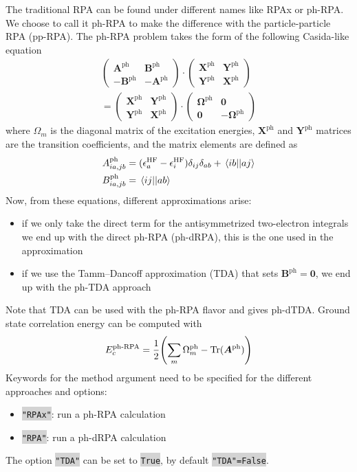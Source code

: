 \documentclass[aip,jcp,reprint,noshowkeys,superscriptaddress]{revtex4-1}
\newcommand{\GW}{\text{$GW$}}
\newcommand{\HF}{\text{HF}}
\newcommand{\ph}{\text{ph}}
\newcommand{\ep}{\epsilon}
\newcommand{\bO}{\boldsymbol{0}}
\newcommand{\bX}{\bm{X}}
\newcommand{\bY}{\bm{Y}}
\newcommand{\bA}{\boldsymbol{A}}
\newcommand{\bB}{\boldsymbol{B}}
\newcommand{\bOme}{\boldsymbol{\Omega}}
\newcommand{\Mat}[2]{\bm{#1}^{\text{#2}}}
\newcommand{\keyword}[1]{{\colorbox{lightgray}{\texttt{#1}}}}
\begin{document}
The traditional RPA can be found under different names like RPAx or ph-RPA. \cite{SchuckBook} We choose to call it ph-RPA to make the difference with the particle-particle RPA (pp-RPA). The ph-RPA problem takes the form of the following Casida-like equation 
\begin{multline}
\label{eq:phRPA}
	\begin{pmatrix}
		\bA^{\ph} & \bB^{\ph} 
		\\
		- \bB^{\ph} &  -\bA^{\ph}
	\end{pmatrix}
	\cdot
	\begin{pmatrix}
		\bX^{\ph} & \bY^{\ph}
		\\
		\bY^{\ph} & \bX^{\ph}
	\end{pmatrix}
	\\
	=
	\begin{pmatrix}
		\bX^{\ph} & \bY^{\ph}
		\\
		\bY^{\ph} & \bX^{\ph}
	\end{pmatrix}
	\cdot
	\begin{pmatrix}
		\bOme^{\ph} & \bO
		\\
		\bO & -\bOme^{\ph}
	\end{pmatrix}
\end{multline} 
where $\Omega_m$ is the diagonal matrix of the excitation energies, $\bX^{\ph}$ and $\bY^{\ph}$ matrices are the transition coefficients, and the matrix elements are defined as 
\begin{align}
	A_{ia,jb}^\ph & = (\ep_{a}^{\HF} - \ep_{i}^{\HF}) \delta_{ij} \delta_{ab} + \mel{ib}{}{aj} 
	\\
	B_{ia,jb}^\ph & = \mel{ij}{}{ab} 
\end{align}
Now, from these equations, different approximations arise:
\begin{itemize}
\item if we only take the direct term for the antisymmetrized two-electron integrals we end up with the direct ph-RPA (ph-dRPA), this is the one used in the {\GW} approximation
\item if we use the Tamm–Dancoff approximation (TDA) that sets $\Mat{B}{ph}=\bm{0}$, we end up with the ph-TDA approach
\end{itemize}
Note that TDA can be used with the ph-RPA flavor and gives ph-dTDA. Ground state correlation energy can be computed with 
\begin{equation}
E_c^{\text{ph-RPA}}=\frac{1}{2} \qty(\sum_m \Omega_m^{\ph} - \text{Tr}(\bm{A}^{\ph})) 
\end{equation}
Keywords for the method argument need to be specified for the different approaches and options:
\begin{itemize}
\item \keyword{"RPAx"}: run a ph-RPA calculation
\item \keyword{"RPA"}: run a ph-dRPA calculation
\end{itemize}
The option \keyword{"TDA"} can be set to \keyword{True}, by default \keyword{"TDA"=False}.
\end{document}
